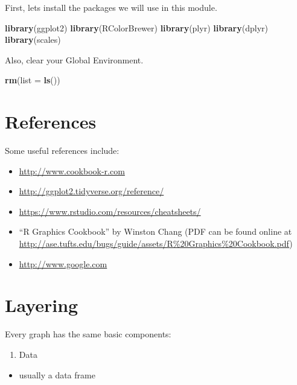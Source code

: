 \documentclass[]{book}
\newenvironment{Shaded}{\begin{snugshade}}{\end{snugshade}}
\newcommand{\KeywordTok}[1]{\textcolor[rgb]{0.13,0.29,0.53}{\textbf{{#1}}}}
\newcommand{\DataTypeTok}[1]{\textcolor[rgb]{0.13,0.29,0.53}{{#1}}}
\newcommand{\NormalTok}[1]{{#1}}
\providecommand{\tightlist}{%
  \setlength{\itemsep}{0pt}\setlength{\parskip}{0pt}}
\theoremstyle{definition}
\theoremstyle{definition}
\theoremstyle{remark}
\begin{document}
First, lets install the packages we will use in this module.

\begin{Shaded}
\begin{Highlighting}[]
\KeywordTok{library}\NormalTok{(ggplot2)}
\KeywordTok{library}\NormalTok{(RColorBrewer)}
\KeywordTok{library}\NormalTok{(plyr)}
\KeywordTok{library}\NormalTok{(dplyr)}
\KeywordTok{library}\NormalTok{(scales)}
\end{Highlighting}
\end{Shaded}

Also, clear your Global Environment.

\begin{Shaded}
\begin{Highlighting}[]
\KeywordTok{rm}\NormalTok{(}\DataTypeTok{list =} \KeywordTok{ls}\NormalTok{())}
\end{Highlighting}
\end{Shaded}

\section{References}\label{references}

Some useful references include:

\begin{itemize}
\item
  \url{http://www.cookbook-r.com}
\item
  \url{http://ggplot2.tidyverse.org/reference/}
\item
  \url{https://www.rstudio.com/resources/cheatsheets/}
\item
  ``R Graphics Cookbook'' by Winston Chang (PDF can be found online at
  \url{http://ase.tufts.edu/bugs/guide/assets/R\%20Graphics\%20Cookbook.pdf})
\item
  \url{http://www.google.com}
\end{itemize}

\section{Layering}\label{layering}

Every graph has the same basic components:

\begin{enumerate}
\def\labelenumi{\arabic{enumi}.}
\tightlist
\item
  Data
\end{enumerate}

\begin{itemize}
\tightlist
\item
  usually a data frame
\end{itemize}
\end{document}
